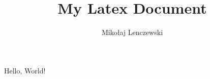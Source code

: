 \documentclass{article}
\author{Mikołaj Lenczewski}
\title{My Latex Document}
\begin{document}
\maketitle

Hello, World!
\end{document}
